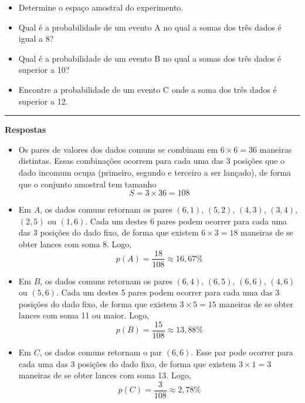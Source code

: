 \documentclass{article}
\begin{document}
\begin{itemize}
\item [a)] Determine o espaço amostral do experimento.
\item [b)] Qual é a probabilidade de um evento A no qual a somas dos três dados é igual a 8?
\item [c)] Qual é a probabilidade de um evento B no qual a somas dos três dados é superior a 10?
\item [d)] Encontre a probabilidade de um evento C onde a soma dos três dados é superior a 12.
\end{itemize}
\rule{\linewidth}{0.5pt}

\textbf{\sffamily Respostas}

\begin{itemize}
\item [a)] 
Os pares de valores dos dados comuns se combinam em $6\times 6 = 36$ maneiras distintas. 
Essas combinações ocorrem para cada uma das 3 posições que o dado incomum ocupa (primeiro, segundo e terceiro a ser lançado), de forma que o conjunto amostral tem tamanho
%
\begin{equation*}
\boxed{
    S = 3\times 36 
      = 108 
}
\end{equation*}


\item [b)] 
Em $A$, os dados comuns retornam os pares 
$(6, 1)$,
$(5, 2)$,
$(4, 3)$,
$(3, 4)$,
$(2, 5)$ ou
$(1, 6)$.
Cada um destes 6 pares podem ocorrer para cada uma das 3 posições do dado fixo, de forma que existem $6\times 3 = 18$ maneiras de se obter lances com soma 8.
Logo,
%
\begin{equation*}
\boxed{
    p(A) = \frac{18}{108}
         \approx 16,67\%
}
\end{equation*}

\item [c)]
Em $B$, os dados comuns retornam os pares 
$(6, 4)$,
$(6, 5)$,
$(6, 6)$,
$(4, 6)$ ou
$(5, 6)$.
Cada um destes 5 pares podem ocorrer para cada uma das 3 posições do dado fixo, de forma que existem $3\times 5 = 15$ maneiras de se obter lances com soma 11 ou maior.
Logo,
%
\begin{equation*}
\boxed{
    p(B) = \frac{15}{108}
         \approx 13,88\%
}
\end{equation*}

\item [d)]
Em $C$, os dados comuns retornam o par 
$(6, 6)$.
Esse par pode ocorrer para cada uma das 3 posições do dado fixo, de forma que existem $3\times 1 = 3$ maneiras de se obter lances com soma 13.
Logo,
%
\begin{equation*}
\boxed{
    p(C) = \frac{3}{108}
         \approx 2,78\%
}
\end{equation*}
\end{itemize}
\end{document}
